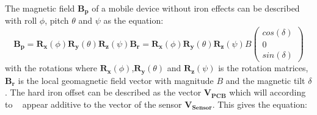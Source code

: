 The magnetic field $\boldsymbol{B_p}$ of a mobile device without iron effects can be described with roll $\phi$, pitch $\theta$ and $\psi$ as the equation:
\begin{equation} \label{eq:magnField}
  \boldsymbol{B_p} = 
  \boldsymbol{R_x}(\phi)\boldsymbol{R_y}(\theta)\boldsymbol{R_z}(\psi)\boldsymbol{B_r} = 
  \boldsymbol{R_x}(\phi)\boldsymbol{R_y}(\theta)\boldsymbol{R_z}(\psi)B\begin{pmatrix}cos(\delta) \\ 0  \\ sin(\delta)\end{pmatrix}
\end{equation}
with the rotations where $ \boldsymbol{R_x}(\phi)$,$\boldsymbol{R_y}(\theta)$ and $\boldsymbol{R_z}(\psi)$ is the rotation matrices, $\boldsymbol{B_r}$ is the local geomagnetic field vector with magnitude $B$ and the magnetic tilt $\delta$. The hard iron offset can be described as the vector $\boldsymbol{V_{PCB}}$ which will according to ~\cite{sensor:magnIron} appear additive to the vector of the sensor $\boldsymbol{V_{Sensor}}$. This gives the equation:
\begin{equation}
\end{equation}
~\cite[]{sensor:magnIron}